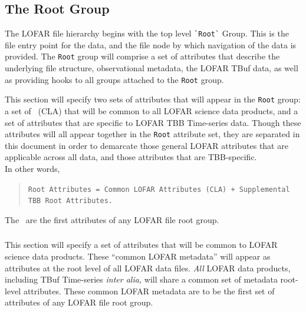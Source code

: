 \documentclass[a4paper,10pt,bibtotoc]{scrartcl}
\begin{document}
\subsection{The Root Group}
\label{sec:root group}

The LOFAR file hierarchy begins with the top level \verb|`Root`| Group.  This is
the file entry point for the data, and the file node by which navigation of
the data is provided. The \texttt{Root} group will comprise a set of attributes
that describe the underlying file structure, observational metadata, the LOFAR
TBuf data, as well as providing hooks to all groups attached to the \texttt{Root} group.

This section will specify two sets of attributes that will appear in
the \texttt{Root} group: a set of \cla\ (CLA) that will be common to
all LOFAR science data products, and a set of attributes that are
specific to LOFAR TBB Time-series data.  Though these attributes will
all appear together in the \texttt{Root} attribute set, they are
separated in this document in order to demarcate those general LOFAR
attributes that are applicable across all data, and those attributes
that are TBB-specific.\\
In other words,

\begin{verse}
\verb|Root Attributes = Common LOFAR Attributes (CLA) + Supplemental TBB Root Attributes.|
\end{verse}

The \cla\ are the first attributes of any LOFAR file root group.

\subsubsection{\cla}
\label{sec:common lofar attributes}

This section will specify a set of attributes that will be common to
LOFAR science data products.  These ``common LOFAR metadata'' will
appear as attributes at the root level of all LOFAR data files.
\textit{All} LOFAR data products, including TBuf Time-series
\textit{inter alia,} will share a common set of metadata root-level
attributes.  These common LOFAR metadata are to be the first set of attributes of any LOFAR file root group.
\end{document}
